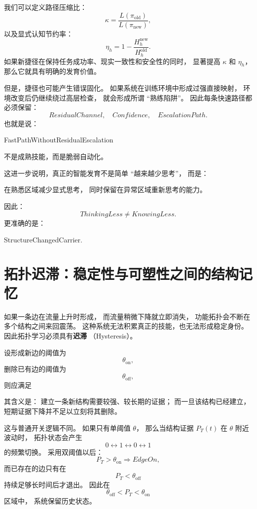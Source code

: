 我们可以定义路径压缩比：
\[
\kappa
=
\frac{
L(\pi_{\mathrm{old}})
}{
L(\pi_{\mathrm{new}})
},
\]
以及显式认知节约率：
\[
\eta_h
=
1-
\frac{
H_h^{\mathrm{new}}
}{
H_h^{\mathrm{old}}
}.
\]
如果新捷径在保持任务成功率、现实一致性和安全性的同时，
显著提高 $\kappa$ 和 $\eta_h$，
那么它就具有明确的发育价值。

但是，捷径也可能产生错误固化。
如果系统在训练环境中形成过强直接映射，
环境改变后仍继续绕过高层检查，
就会形成所谓 ``熟练陷阱''。
因此每条快速路径都必须保留：
\[
ResidualChannel,
\quad
Confidence,
\quad
EscalationPath.
\]
也就是说：
\begin{statementbox}
FastPathWithoutResidualEscalation
\end{statementbox}
不是成熟技能，而是脆弱自动化。

这进一步说明，真正的智能发育不是简单 ``越来越少思考''，
而是：
\begin{statementbox}
在熟悉区域减少显式思考，
同时保留在异常区域重新思考的能力。
\end{statementbox}
因此：
\[
ThinkingLess\neq KnowingLess.
\]
更准确的是：
\begin{statementbox}
StructureChangedCarrier.
\end{statementbox}

\section{拓扑迟滞：稳定性与可塑性之间的结构记忆}

如果一条边在流量上升时形成，
而流量稍微下降就立即消失，
功能拓扑会不断在多个结构之间来回震荡。
这种系统无法积累真正的技能，也无法形成稳定身份。
因此拓扑学习必须具有\textbf{迟滞}
（Hysteresis）。

设形成新边的阈值为
\[
\theta_{\mathrm{on}},
\]
删除已有边的阈值为
\[
\theta_{\mathrm{off}},
\]
则应满足
\begin{statementbox}
\centering
{}
\end{statementbox}
其含义是：
建立一条新结构需要较强、较长期的证据；
而一旦该结构已经建立，
短期证据下降并不足以立刻将其删除。

这与普通开关逻辑不同。
如果只有单阈值 $\theta$，
那么当结构证据 $P_T(t)$ 在 $\theta$ 附近波动时，
拓扑状态会产生
\[
0\leftrightarrow1\leftrightarrow0\leftrightarrow1
\]
的频繁切换。
采用双阈值以后：
\[
P_T>\theta_{\mathrm{on}}
\Rightarrow
EdgeOn,
\]
而已存在的边只有在
\[
P_T<\theta_{\mathrm{off}}
\]
持续足够长时间后才退出。
因此在
\[
\theta_{\mathrm{off}}
<
P_T
<
\theta_{\mathrm{on}}
\]
区域中，
系统保留历史状态。

